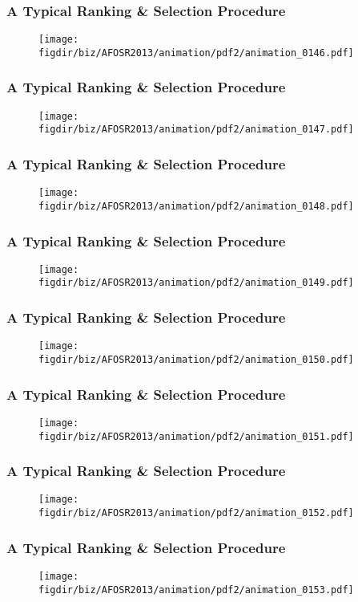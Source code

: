 \documentclass[13pt]{beamer}
\newcommand{\figdir}{../../fig}
\begin{document}
{\begin{frame}\frametitle{A Typical Ranking \& Selection Procedure}\begin{figure}\texttt{[image: \\figdir/biz/AFOSR2013/animation/pdf2/animation\_0146.pdf]}\end{figure}\end{frame}
\begin{frame}\frametitle{A Typical Ranking \& Selection Procedure}\begin{figure}\texttt{[image: \\figdir/biz/AFOSR2013/animation/pdf2/animation\_0147.pdf]}\end{figure}\end{frame}
\begin{frame}\frametitle{A Typical Ranking \& Selection Procedure}\begin{figure}\texttt{[image: \\figdir/biz/AFOSR2013/animation/pdf2/animation\_0148.pdf]}\end{figure}\end{frame}
\begin{frame}\frametitle{A Typical Ranking \& Selection Procedure}\begin{figure}\texttt{[image: \\figdir/biz/AFOSR2013/animation/pdf2/animation\_0149.pdf]}\end{figure}\end{frame}
\begin{frame}\frametitle{A Typical Ranking \& Selection Procedure}\begin{figure}\texttt{[image: \\figdir/biz/AFOSR2013/animation/pdf2/animation\_0150.pdf]}\end{figure}\end{frame}
\begin{frame}\frametitle{A Typical Ranking \& Selection Procedure}\begin{figure}\texttt{[image: \\figdir/biz/AFOSR2013/animation/pdf2/animation\_0151.pdf]}\end{figure}\end{frame}
\begin{frame}\frametitle{A Typical Ranking \& Selection Procedure}\begin{figure}\texttt{[image: \\figdir/biz/AFOSR2013/animation/pdf2/animation\_0152.pdf]}\end{figure}\end{frame}
\begin{frame}\frametitle{A Typical Ranking \& Selection Procedure}\begin{figure}\texttt{[image: \\figdir/biz/AFOSR2013/animation/pdf2/animation\_0153.pdf]}\end{figure}\end{frame}
}
\end{document}
